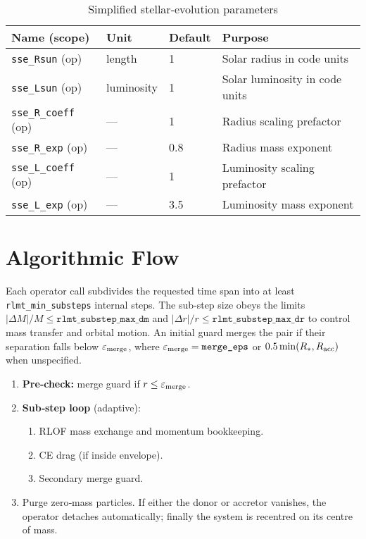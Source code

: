 \documentclass[11pt]{article}
\begin{document}
\begin{table}[h]
\centering\footnotesize
\caption{Simplified stellar-evolution parameters}
\label{tab:sse}
\begin{tabular}{@{}llll@{}}
\toprule
Name (scope) & Unit & Default & Purpose \\
\midrule
\texttt{sse\_Rsun}   (op) & length     & 1   & Solar radius in code units\\
\texttt{sse\_Lsun}   (op) & luminosity & 1   & Solar luminosity in code units\\
\texttt{sse\_R\_coeff} (op) & —       & 1   & Radius scaling prefactor\\
\texttt{sse\_R\_exp}   (op) & —       & 0.8 & Radius mass exponent\\
\texttt{sse\_L\_coeff} (op) & —       & 1   & Luminosity scaling prefactor\\
\texttt{sse\_L\_exp}   (op) & —       & 3.5 & Luminosity mass exponent\\
\bottomrule
\end{tabular}
\end{table}

\section{Algorithmic Flow}

Each operator call subdivides the requested time span into at least
\texttt{rlmt\_min\_substeps} internal steps.  The sub‑step size obeys the
limits $|\Delta M|/M\le\texttt{rlmt\_substep\_max\_dm}$ and
$|\Delta r|/r\le\texttt{rlmt\_substep\_max\_dr}$ to control mass transfer and
orbital motion.  An initial guard merges the pair if their separation falls
below $\varepsilon_{\rm merge}$, where
$\varepsilon_{\rm merge}=\texttt{merge\_eps}$ or
$0.5\min(R_{*},R_{\rm acc})$ when unspecified.

\begin{enumerate}[nosep]
\item \textbf{Pre‑check:} merge guard if $r\le\varepsilon_{\rm merge}$.
\item \textbf{Sub‑step loop} (adaptive):
  \begin{enumerate}[nosep]
    \item RLOF mass exchange and momentum bookkeeping.
    \item CE drag (if inside envelope).
    \item Secondary merge guard.
  \end{enumerate}
\item Purge zero‑mass particles.  If either the donor or accretor vanishes,
      the operator detaches automatically; finally the system is recentred on
      its centre of mass.
\end{enumerate}
\end{document}
